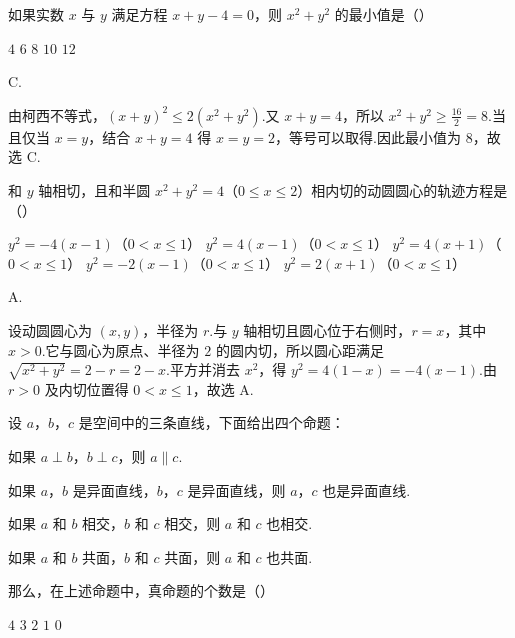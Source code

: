 \begin{problem}

如果实数 \(x\) 与 \(y\) 满足方程 \(x + y - 4 = 0 \)，则 \(x^{2} + y^{2} \) 的最小值是（\quad）

\choicesfive
    {\(4\)}
    {\(6\)}
    {\(8\)}
    {\(10\)}
    {\(12\)}
\end{problem}

\begin{answer}
C.
\end{answer}

\begin{solution}
由柯西不等式，\((x+y)^2\leqslant2(x^2+y^2)\).又 \(x+y=4\)，所以 \(x^2+y^2\geqslant\frac{16}{2}=8\).当且仅当 \(x=y\)，结合 \(x+y=4\) 得 \(x=y=2\)，等号可以取得.因此最小值为 \(8\)，故选 C.
\end{solution}

\begin{problem}

和 \(y\) 轴相切，且和半圆 \(x^{2} + y^{2} = 4\)（\(0 \leqslant x \leqslant 2\)）相内切的动圆圆心的轨迹方程是（\quad）

\choicesfive
    {\(y^{2} = -4(x - 1)\)（\(0 < x \leqslant 1\)）}
    {\(y^{2} = 4(x - 1)\)（\(0 < x \leqslant 1\)）}
    {\(y^{2}=4(x+1)\)（\(0<x\leqslant1\)）}
    {\(y^{2}=-2(x-1)\)（\(0<x\leqslant1\)）}
    {\(y^{2}=2(x+1)\)（\(0<x\leq1\)）}
\end{problem}

\begin{answer}
A.
\end{answer}

\begin{solution}
设动圆圆心为 \((x,y)\)，半径为 \(r\).与 \(y\) 轴相切且圆心位于右侧时，\(r=x\)，其中 \(x>0\).它与圆心为原点、半径为 \(2\) 的圆内切，所以圆心距满足 \(\sqrt{x^2+y^2}=2-r=2-x\).平方并消去 \(x^2\)，得 \(y^2=4(1-x)=-4(x-1)\).由 \(r>0\) 及内切位置得 \(0<x\leqslant1\)，故选 A.
\end{solution}

\begin{problem}

设 \(a\)，\(b\)，\(c\) 是空间中的三条直线，下面给出四个命题：

\begin{circlelist}
\item 如果 \(a \perp b\)，\(b \perp c\)，则 \(a \parallel c\).
\item 如果 \(a\)，\(b\) 是异面直线，\(b\)，\(c\) 是异面直线，则 \(a\)，\(c\) 也是异面直线.
\item 如果 \(a\) 和 \(b\) 相交，\(b\) 和 \(c\) 相交，则 \(a\) 和 \(c\) 也相交.
\item 如果 \(a\) 和 \(b\) 共面，\(b\) 和 \(c\) 共面，则 \(a\) 和 \(c\) 也共面.
\end{circlelist}

那么，在上述命题中，真命题的个数是（\quad）

\choicesfive
    {\(4\)}
    {\(3\)}
    {\(2\)}
    {\(1\)}
    {\(0\)}
\end{problem}

